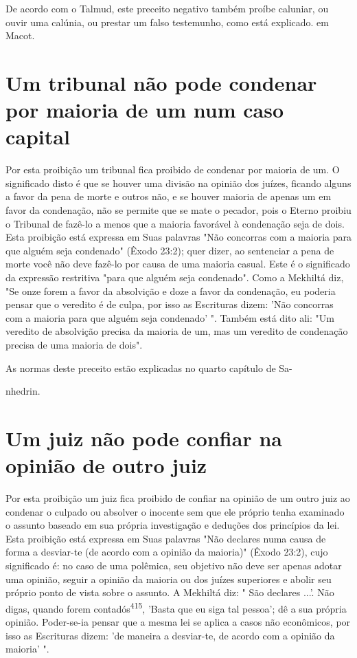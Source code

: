 \begin{itemize}
\begin{enumrate}
\begin{itemize}
\begin{itemize}
\begin{itemize}
De acordo com o Talmud, este preceito negativo também proíbe ca­luniar,
ou ouvir uma calúnia, ou prestar um falso testemunho, como está
expli­cado. em Macot.

\section{Um tribunal não pode condenar por maioria de um num caso capital}

Por esta proibição um tribunal fica proibido de condenar por maio­ria de
um. O significado disto é que se houver uma divisão na opinião dos
juízes, ficando alguns a favor da pena de morte e outros não, e se
houver maioria de apenas um em favor da condenação, não se permite que
se mate o pecador, pois o Eterno proibiu o Tribunal de fazê-lo a menos
que a maioria favorável à conde­nação seja de dois. Esta proibição está
expressa em Suas palavras "Não concor­ras com a maioria para que alguém
seja condenado" (Êxodo 23:2); quer dizer, ao sentenciar a pena de morte
você não deve fazê-lo por causa de uma maioria casual. Este é o
significado da expressão restritiva "para que alguém seja conde­nado".
Como a Mekhiltá diz, "Se onze forem a favor da absolvição e doze a
fa­vor da condenação, eu poderia pensar que o veredito é de culpa, por
isso as Escrituras dizem: 'Não concorras com a maioria para que alguém
seja condena­do' ". Também está dito ali: "Um veredito de absolvição
precisa da maioria de um, mas um veredito de condenação precisa de uma
maioria de dois".


As normas deste preceito estão explicadas no quarto capítulo de Sa-


nhedrin.

\section{Um juiz não pode confiar na opinião de outro juiz}

Por esta proibição um juiz fica proibido de confiar na opinião de um
outro juiz ao condenar o culpado ou absolver o inocente sem que ele
próprio tenha examinado o assunto baseado em sua própria investigação e
deduções dos princípios da lei. Esta proibição está expressa em Suas
palavras "Não decla­res numa causa de forma a desviar-te (de acordo com
a opinião da maioria)" (Êxodo 23:2), cujo significado é: no caso de uma
polêmica, seu objetivo não deve ser apenas adotar uma opinião, seguir a
opinião da maioria ou dos juízes superiores e abolir seu próprio ponto
de vista sobre o assunto. A Mekhiltá diz: " São declares ...'. Não
digas, quando forem contadós\textsuperscript{415}, 'Basta que eu siga
tal pessoa'; dê a sua própria opinião. Poder-se-ia pensar que a mesma
lei se apli­ca a casos não econômicos, por isso as Escrituras dizem: 'de
maneira a desviar-te, de acordo com a opinião da maioria' ".


\end{itemize}
\end{itemize}
\end{itemize}
\end{enumrate}
\end{itemize}
